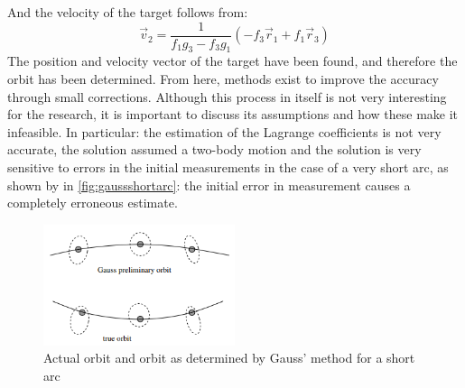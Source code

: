 And the velocity of the target follows from:
\begin{equation}
    \vec{v}_2 = \frac{1}{f_1g_3 - f_3g_1}\left(-f_3\vec{r}_1 + f_1 \vec{r}_3\right)
\end{equation}
The position and velocity vector of the target have been found, and therefore the orbit has been determined. From here, methods exist to improve the accuracy through small corrections. Although this process in itself is not very interesting for the research, it is important to discuss its assumptions and how these make it infeasible. In particular: the estimation of the Lagrange coefficients is not very accurate, the solution assumed a two-body motion and the solution is very sensitive to errors in the initial measurements in the case of a very short arc, as shown by \cite{classicmodernorbits} in \autoref{fig:gaussshortarc}: the initial error in measurement causes a completely erroneous estimate.

\begin{figure}[htbp]
    \centering
    \includegraphics[width=0.5\textwidth]{images/gausstruearc.png}
    \caption{Actual orbit and orbit as determined by Gauss' method for a short arc}
    \label{fig:gaussshortarc}
\end{figure}

